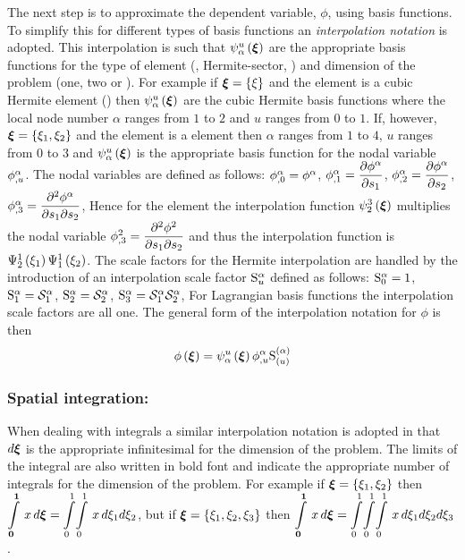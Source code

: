 The next step is to approximate the dependent variable, $\phi$, using basis
functions. To simplify this for different types of basis functions an
\emph{interpolation notation} is adopted. This
interpolation is such that $\gbfn{\alpha}{u}{\vect{\xi}}$ are the appropriate
basis functions for the type of element (\eg \bicubicherm, Hermite-sector,
\etc) and dimension of the problem (one, two or \threedal). For example if
$\vect{\xi}=\bbrac{\xi}$ and the element is a cubic Hermite element 
() then
$\gbfn{\alpha}{u}{\vect{\xi}}$ are the cubic Hermite basis functions where
the local node number $\alpha$ ranges from $1$ to $2$ and $u$ ranges from $0$ to $1$. 
If, however, $\vect{\xi}=\bbrac{\xione,\xitwo}$ and the element is a \bicubicherm element
then $\alpha$ ranges from $1$ to $4$, $u$ ranges from $0$ to $3$ and
$\gbfn{\alpha}{u}{\vect{\xi}}$ is the appropriate basis function for the nodal
variable $  {\phi}^{\alpha} _{,u} $. The nodal variables are defined as
follows: $  {\phi}^{\alpha} _{,0} = {\phi}^{\alpha} $,
$  {\phi}^{\alpha} _{,1} = \dfrac{\partial  {\phi}^{\alpha} }{\partial s_{1}} $,
$  {\phi}^{\alpha} _{,2} = \dfrac{\partial  {\phi}^{\alpha} }{\partial s_{2}} $,
$  {\phi}^{\alpha} _{,3} = \dfrac{\partial^{2}  {\phi}^{\alpha} }{\partial s_{1} \partial s_{2}} $,
\etc Hence for the \bicubicherm element the interpolation function
$\gbfn{2}{3}{\vect{\xi}}$ multiplies the nodal variable
$\phi^{2}_{,3}= \dfrac{\partial^{2} \phi^{2}}{\partial s_{1} \partial s_{2}} $ and thus the
interpolation function is $   \Psi_{2}^{1} \left( \xi_{1} \right)     \Psi_{1}^{1} \left( \xi_{2} \right)  $.  The
scale factors for the Hermite interpolation are handled by the introduction of
an interpolation scale factor $ \mathrm{S}^{\alpha}_{u} $ defined as follows:
$ \mathrm{S}^{\alpha}_{0} =1$, $ \mathrm{S}^{\alpha}_{1} = \mathcal{S}^{\alpha}_{1} $, $ \mathrm{S}^{\alpha}_{2} =
 \mathcal{S}^{\alpha}_{2} $, $ \mathrm{S}^{\alpha}_{3} = \mathcal{S}^{\alpha}_{1}  \mathcal{S}^{\alpha}_{2} $,
\etc For Lagrangian basis functions the interpolation scale factors are all
one. The general form of the interpolation notation for $\phi$ is then
\begin{equation}
  \fnof{\phi}{\vect{\xi}}=\gbfn{\alpha}{u}{\vect{\xi}}\nodedof{\phi}
  {\alpha}{u}\gsf{(\alpha)}{(u)}
  \label{eqn:phiinterpolation}
\end{equation}

\subsubsection{Spatial integration:}
When dealing with integrals a similar interpolation notation is adopted in
that $d\vect{\xi}$ is the appropriate infinitesimal for the dimension of the
problem. The limits of the integral are also written in bold font and indicate
the appropriate number of integrals for the dimension of the problem.  For
example if $\vect{\xi}=\bbrac{\xione,\xitwo}$ then
$\gint{\vect{0}}{\vect{1}}{x}
{\vect{\xi}}=\giint{0}{1}{0}{1}{x}{\xione}{\xitwo}$, but if $\vect{\xi}=
\bbrac{\xione,\xitwo,\xithree}$ then $\gint{\vect{0}}{\vect{1}}{x}
{\vect{\xi}}=\dintl{0}{1}\!\dintl{0}{1}\!\dintl{0}{1}\,x\,d\xione d\xitwo
d\xithree$.

